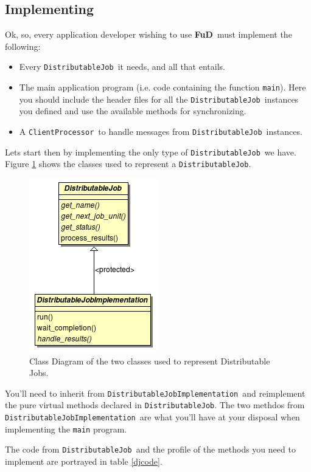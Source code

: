 \documentclass[a4paper,12pt,english]{article}
\newcommand{\fud}{\textbf{FuD}}
\renewcommand{\DJ}{\texttt{DistributableJob}}
\newcommand{\DJI}{\texttt{DistributableJobImplementation}}
\newcommand{\CP}{\texttt{ClientProcessor}}
\begin{document}
\subsection{Implementing}

Ok, so, every application developer wishing to use \fud \ must implement the following:
\begin{itemize}
\item Every \DJ \ it needs, and all that entails.
\item The main application program (i.e. code containing the function \texttt{main}). Here you should include the header files for all the \DJ \ instances you defined and use the available methods for synchronizing.
\item A \CP \ to handle messages from \DJ \ instances.
\end{itemize}

Lets start then by implementing the only type of \DJ \ we have. Figure \ref{djdiag} shows the classes used to represent a \DJ. 

\begin{figure}[!ht]\label{djdiag}
\begin{center}
\includegraphics [bb= 0 0 211 286]{../design/graphics/Distributable-Jobs.png}
\end{center}
\caption{Class Diagram of the two classes used to represent Distributable Jobs.}
\end{figure}

You'll need to inherit from \DJI \ and reimplement the pure virtual methods declared in \DJ. The two methdos from \DJI \ are what you'll have at your disposal when implementing the \texttt{main} program.

The code from \DJ \ and the profile of the methods you need to implement are portrayed in table \ref{djcode}.
\end{document}
